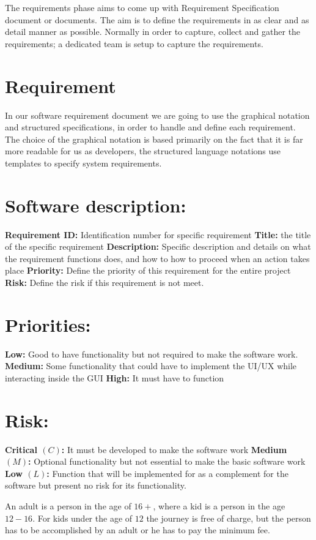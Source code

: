 The requirements phase aims to come up with Requirement Specification document or documents. The aim is to define the requirements in as clear and as detail manner as possible. Normally in order to capture, collect and gather the requirements; a dedicated team is setup to capture the requirements. 


\section*{Requirement}
In our software requirement document we are going to use the graphical notation and structured specifications, in order to handle and define each requirement. The choice of the graphical notation is based primarily on the fact that it is far more readable for us as developers, the structured language notations use templates to specify system
requirements.


\section*{Software description:}
\textbf{Requirement ID:} Identification number for specific requirement
\textbf{Title:} the title of the specific requirement
\textbf{Description:} Specific description and details on what the requirement functions does, and how to how to proceed when an action takes place
\textbf{Priority:} Define the priority of this requirement for the entire project
\textbf{Risk:} Define the risk if this requirement is not meet.

\section*{Priorities:}
\textbf{Low:} Good to have functionality but not required to make the software work.
\textbf{Medium:} Some functionality that could have to implement the UI/UX while interacting inside the GUI
\textbf{High:} It must have to function

\section*{Risk:}
\textbf{Critical $(C)$:} It must be developed to make the software work
\textbf{Medium $(M)$:} Optional functionality but not essential to make the basic software work
\textbf{Low $(L)$:} Function that will be implemented for as a complement for the software but present no risk for its functionality. 

An adult is a person in the age of $16+$, where a kid is a person in the age $12 - 16$. For kids under the age of $12$ the journey is free of charge, but the person has to be accomplished by an adult or he has to pay the minimum fee.

